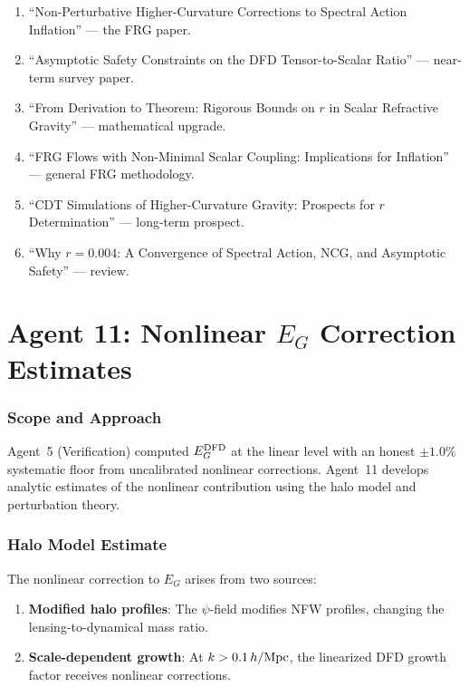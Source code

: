 \documentclass[11pt,a4paper]{article}
\begin{document}
\begin{enumerate}
\item ``Non-Perturbative Higher-Curvature Corrections to Spectral Action Inflation'' --- the FRG paper.
\item ``Asymptotic Safety Constraints on the DFD Tensor-to-Scalar Ratio'' --- near-term survey paper.
\item ``From Derivation to Theorem: Rigorous Bounds on $r$ in Scalar Refractive Gravity'' --- mathematical upgrade.
\item ``FRG Flows with Non-Minimal Scalar Coupling: Implications for Inflation'' --- general FRG methodology.
\item ``CDT Simulations of Higher-Curvature Gravity: Prospects for $r$ Determination'' --- long-term prospect.
\item ``Why $r = 0.004$: A Convergence of Spectral Action, NCG, and Asymptotic Safety'' --- review.
\end{enumerate}


\part{Agent 11: Nonlinear $E_G$ Correction Estimates}
\label{part:eg-nonlinear}

\section{Scope and Approach}

Agent~5 (Verification) computed $E_G^{\rm DFD}$ at the linear level with an honest $\pm 1.0\%$ systematic floor from uncalibrated nonlinear corrections. Agent~11 develops analytic estimates of the nonlinear contribution using the halo model and perturbation theory.

\section{Halo Model Estimate}

The nonlinear correction to $E_G$ arises from two sources:
\begin{enumerate}
\item \textbf{Modified halo profiles}: The $\psi$-field modifies NFW profiles, changing the lensing-to-dynamical mass ratio.
\item \textbf{Scale-dependent growth}: At $k > 0.1 \, h/{\rm Mpc}$, the linearized DFD growth factor receives nonlinear corrections.
\end{enumerate}
\end{document}
